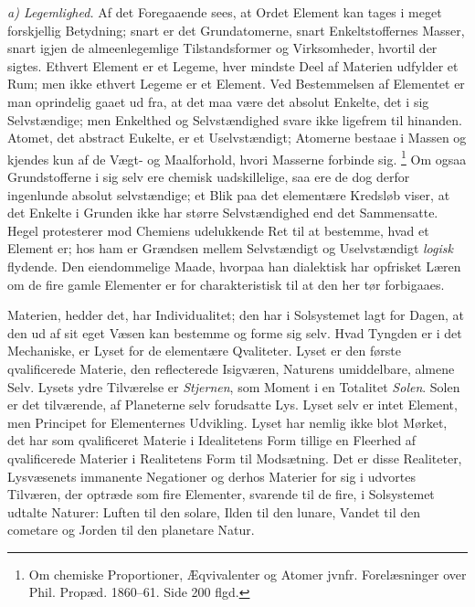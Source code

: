 \documentclass[12pt,a4paper]{book}
\newcommand{\runin}[1]{\emph{#1}\hspace{0.4em}}
\begin{document}
\runin{a) Legemlighed.} Af det Foregaaende sees, at Ordet Element kan
tages i meget forskjellig Betydning; snart er det Grundatomerne, snart
Enkeltstoffernes Masser, snart igjen de almeenlegemlige
Tilstandsformer og Virksomheder, hvortil der sigtes. Ethvert Element
er et Legeme, hver mindste Deel af Materien udfylder et Rum; men ikke
ethvert Legeme er et Element. Ved Bestemmelsen af Elementet er man
oprindelig gaaet ud fra, at det maa være det absolut Enkelte, det i
sig Selvstændige; men Enkelthed og Selvstændighed svare ikke ligefrem
til hinanden. Atomet, det abstract
Eukelte, er et Uselvstændigt; Atomerne bestaae i Massen og kjendes kun
af de Vægt- og Maalforhold, hvori Masserne forbinde sig.%
\footnote{%
Om chemiske Proportioner, Æqvivalenter og Atomer jvnfr.
Forelæsninger over Phil. Propæd. 1860--61. Side 200 flgd.}
Om ogsaa Grundstofferne i sig selv ere chemisk uadskillelige, saa ere
de dog derfor ingenlunde absolut selvstændige; et Blik paa det
elementære Kredsløb viser, at det Enkelte i Grunden ikke har større
Selvstændighed end det Sammensatte. Hegel protesterer mod Chemiens
udelukkende Ret til at bestemme, hvad et Element er; hos ham er
Grændsen mellem Selvstændigt og Uselvstændigt
\emph{logisk} flydende. Den eiendommelige Maade, hvorpaa han dialektisk
har opfrisket Læren om de fire gamle Elementer er for charakteristisk
til at den her tør forbigaaes.

Materien, hedder det, har Individualitet; den har i Solsystemet lagt
for Dagen, at den ud af sit eget Væsen kan bestemme og forme sig selv.
Hvad Tyngden er i det Mechaniske, er Lyset for de elementære
Qvaliteter. Lyset er den første qvalificerede Materie, den
reflecterede Isigværen, Naturens umiddelbare, almene Selv. Lysets ydre
Tilværelse
er \emph{Stjernen}, som Moment i en Totalitet \emph{Solen}. Solen er
det tilværende, af Planeterne selv forudsatte Lys. Lyset selv er intet
Element, men Principet for Elementernes Udvikling. Lyset har nemlig
ikke blot Mørket, det har som qvalificeret Materie i Idealitetens Form
tillige en Fleerhed af qvalificerede Materier i Realitetens Form til
Modsætning. Det er disse Realiteter, Lysvæsenets immanente Negationer
og derhos Materier for sig i udvortes Tilværen, der optræde som fire
Elementer, svarende til de fire, i Solsystemet udtalte Naturer: Luften
til den solare, Ilden til den lunare, Vandet til den cometare og
Jorden til den planetare Natur.
\end{document}
